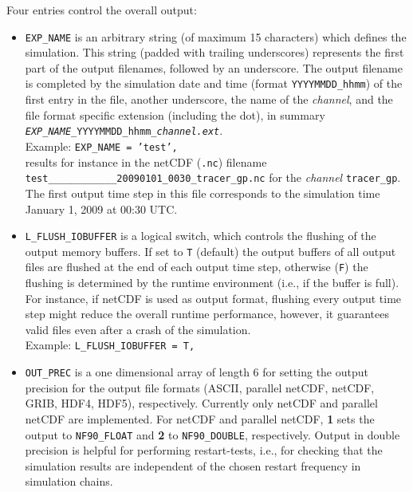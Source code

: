 \documentclass[twoside]{article}
\begin{document}
{Four entries control the overall output:
%
\begin{itemize}
 \item {\tt EXP\_NAME} is an arbitrary string (of maximum 15 characters)
       which defines the simulation.
       This string (padded with trailing underscores) represents the first
       part of the output filenames, followed by an underscore.
       The output filename is completed by the simulation date and time
       (format {\tt YYYYMMDD\_hhmm}) of the first entry in the file, another
       underscore, the name of the {\it channel}, and the file format
       specific extension (including the dot), in summary
       {\tt {\it EXP\_NAME}\_YYYYMMDD\_hhmm\_{\it channel.ext}}.\\
       Example: {\tt EXP\_NAME = 'test',}\\
       results for instance in the netCDF ({\tt .nc}) filename
       \verb|test____________20090101_0030_tracer_gp.nc|
       for the {\it channel} {\tt tracer\_gp}.
       The first output time step in this file corresponds to the simulation
       time January 1, 2009 at 00:30 UTC.
 \item {\tt L\_FLUSH\_IOBUFFER} is a logical switch, which controls the
       flushing
       of the output memory buffers. If set to {\tt T} (default) the output
       buffers of all output files are flushed at the end of each output
       time step, otherwise ({\tt F}) the flushing is determined by the
       runtime environment (i.e., if the buffer is full). For instance,
       if netCDF
       is used as output format, flushing every output time step
       might reduce the overall runtime performance, however, it guarantees
       valid files even after a crash of the simulation.\\
       Example: {\tt L\_FLUSH\_IOBUFFER = T,}
 \item {\tt OUT\_PREC} is a one dimensional array of length 6 for setting
       the output precision for the output file formats
       (ASCII, parallel netCDF, netCDF, GRIB, HDF4, HDF5), respectively.
       Currently only netCDF and parallel netCDF are implemented.
       For netCDF and parallel netCDF, {\bf 1} sets the output to
       {\tt NF90\_FLOAT}
       and {\bf 2} to {\tt NF90\_DOUBLE}, respectively.
       Output in double precision is helpful
       for performing restart-tests, i.e., for checking that the simulation
       results are independent of the chosen restart frequency in
       simulation chains.\\

\end{itemize}}
\end{document}
